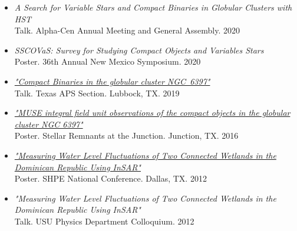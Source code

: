 \documentclass[letterpaper,10pt]{article}
\begin{document}
\begin{itemize}[label=$\blacktriangleright$]
\item \textit{A Search for Variable Stars and Compact Binaries in Globular Clusters with HST}\\ Talk. Alpha-Cen Annual Meeting and General Assembly. 2020


\item \textit{SSCOVaS: Survey for Studying Compact Objects and Variables Stars}\\ Poster. 36th Annual New Mexico Symposium. 2020

\item \textit{\href{https://manuelpm.me/TexasAPS2019/}{"Compact Binaries in the globular cluster NGC~6397"}} \\Talk. Texas APS Section. Lubbock, TX. 2019



\item \textit{\href{http://manuelpm.me/papers/MUSEposter.pdf}{"MUSE integral field unit observations of the compact objects in the globular cluster NGC 6397"}} \\Poster. Stellar Remnants at the Junction. Junction, TX. 2016




\item \textit{\href{http://manuelpm.me/papers/posterinsar.pdf}{"Measuring Water Level Fluctuations of Two Connected Wetlands in the Dominican Republic Using InSAR"}} \\Poster. SHPE National Conference. Dallas, TX. 2012

\item \emph{"Measuring Water Level Fluctuations of Two Connected Wetlands in the Dominican Republic Using InSAR"}\\
Talk. USU Physics Department Colloquium. 2012
\end{itemize}
\begin{comment}
\subsection*{Media Coverage}

\begin{itemize}[label=$\blacktriangleright$]

\item \hyperref[https://phys.org/news/2017-03-planetary-earth-sun.html]{Planetary waves, first found on Earth, are discovered on Sun (phys.org)}

\end{itemize}
\end{comment}
\end{document}
